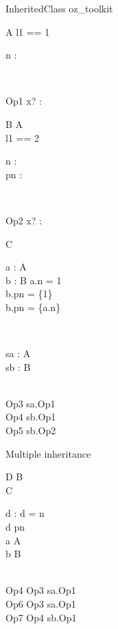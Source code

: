 \begin{zsection}
  \SECTION InheritedClass \parents oz\_toolkit
\end{zsection}

\begin{class}{A}  
  l1 == 1\\
  \begin{state}
    n : \nat
  \end{state}\\
  \begin{op}{Op1}
    x? : \nat
  \end{op}
\end{class}

\begin{class}{B}
  A\\
  l1 == 2\\
  \begin{state}
    n : \nat\\
    pn : \power \nat
  \end{state}\\
  \begin{op}{Op2}
    x? : \power \nat
  \end{op}
\end{class}

\begin{class}{C}
  \begin{axdef}
    a : \poly A\\
    b : B
  \where
    a.n = 1\\
    b.pn = \{1\}\\
    b.pn = \{a.n\}
  \end{axdef}\\
  \begin{state}
    sa : \poly A\\
    sb : B
  \end{state}\\
  Op3 \sdef sa.Op1\\
  Op4 \sdef sb.Op1\\
  Op5 \sdef sb.Op2
\end{class}

Multiple inheritance
\begin{class}{D}
  B\\
  C\\
  \begin{state}
    d : \nat
  \where
    d = n\\
    d \in pn\\
    a \in \poly A\\
    b \in B
  \end{state}\\
  Op4 \sdef Op3 \land sa.Op1\\
  Op6 \sdef Op3 \land sa.Op1\\
  Op7 \sdef Op4 \land sb.Op1
\end{class}

